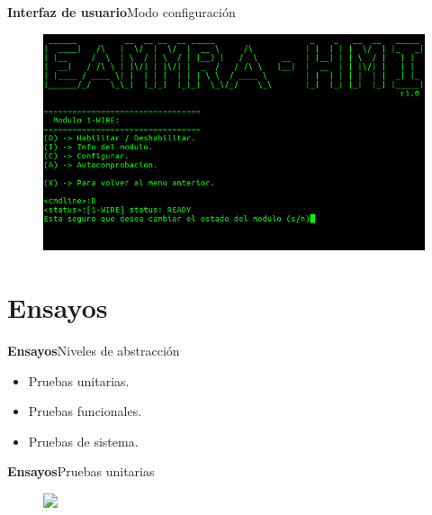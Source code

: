 \documentclass[11pt, xcolor={table,xcdraw}]{beamer}
\begin{document}
\begin{frame}{\textbf{\LARGE{Interfaz de usuario}}}{Modo configuración}
	\vspace{-.7cm}
	\centering
	\begin{figure}[H]
		\includegraphics[width=\textwidth]{./imagenes/interfaz_config_detalle.png}
	\end{figure}	
\end{frame}


\section{Ensayos}

\begin{frame}{\textbf{\LARGE{Ensayos}}}{Niveles de abstracción}
  \fontsize{18pt}{18}\selectfont
	\centering
	\begin{itemize}
		\item Pruebas unitarias.
		\vspace{20px}
		\item Pruebas funcionales.
		\vspace{20px}
		\item Pruebas de sistema.
	\end{itemize}
\end{frame}

\begin{frame}{\textbf{\LARGE{Ensayos}}}{Pruebas unitarias}
	\vspace{-.7cm}
	\begin{figure}[H]
		\includegraphics<1>[width=1\textwidth]{./imagenes/TestUnitario.png}
	\end{figure}	
\end{frame}
\end{document}
